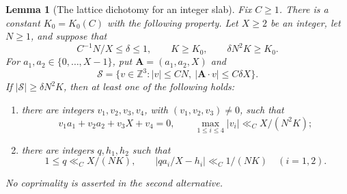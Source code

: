 \documentclass[11pt,a4paper]{article}
\theoremstyle{paperplain}
\newtheorem{lemma}[theorem]{Lemma}
\numberwithin{equation}{section}
\begin{document}
\begin{lemma}[The lattice dichotomy for an integer slab]\label{geo:slab-dichotomy}
Fix $C\ge1$. There is a constant $K_0=K_0(C)$ with the following property.
Let $X\ge2$ be an integer, let $N\ge1$, and suppose that
\[
 C^{-1}N/X\le\delta\le1,\qquad K\ge K_0,\qquad
 \delta N^2K\ge K_0.
\]
For $a_1,a_2\in\{0,\ldots,X-1\}$, put
$\mathbf A=(a_1,a_2,X)$ and
\[
 \mathcal S=\{v\in\mathbb Z^3:|v|\le CN,\
                         |\mathbf A\cdot v|\le C\delta X\}.
\]
If $|\mathcal S|\ge\delta N^2K$, then at least one of the following holds:
\begin{enumerate}
 \item there are integers $v_1,v_2,v_3,v_4$, with
 $(v_1,v_2,v_3)\ne0$, such that
 \[
  v_1a_1+v_2a_2+v_3X+v_4=0,\qquad
  \max_{1\le i\le4}|v_i|\ll_C X/(N^2K);
 \]
 \item there are integers $q,h_1,h_2$ such that
 \begin{equation}\label{geo:simultaneous}
  1\le q\ll_C X/(NK),\qquad
  |qa_i/X-h_i|\ll_C1/(NK)\quad(i=1,2).
 \end{equation}
\end{enumerate}
No coprimality is asserted in the second alternative.
\end{lemma}
\end{document}
